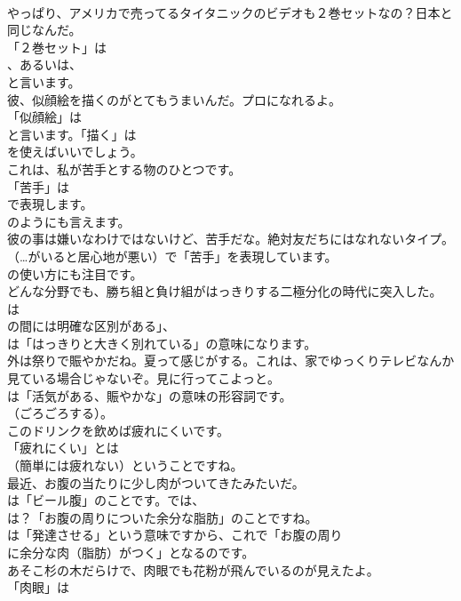 \documentclass[8pt]{extreport}
\begin{document}
\begin{CJK}{UTF8}{min}
\\	やっぱり、アメリカで売ってるタイタニックのビデオも２巻セットなの？日本と同じなんだ。 
\\	「２巻セット」は
\\	、あるいは、
\\	と言います。	
\\	彼、似顔絵を描くのがとてもうまいんだ。プロになれるよ。 
\\	「似顔絵」は
\\	と言います。「描く」は
\\	を使えばいいでしょう。	
\\	これは、私が苦手とする物のひとつです。 
\\	「苦手」は
\\	で表現します。
\\	のようにも言えます。	
\\	彼の事は嫌いなわけではないけど、苦手だな。絶対友だちにはなれないタイプ。 
\\	（…がいると居心地が悪い）で「苦手」を表現しています。
\\	の使い方にも注目です。	
\\	どんな分野でも、勝ち組と負け組がはっきりする二極分化の時代に突入した。 
\\	は
\\	の間には明確な区別がある」、
\\	は「はっきりと大きく別れている」の意味になります。	
\\	外は祭りで賑やかだね。夏って感じがする。これは、家でゆっくりテレビなんか見ている場合じゃないぞ。見に行ってこよっと。 
\\	は「活気がある、賑やかな」の意味の形容詞です。
\\	（ごろごろする）。	
\\	このドリンクを飲めば疲れにくいです。 
\\	「疲れにくい」とは
\\	（簡単には疲れない）ということですね。	
\\	最近、お腹の当たりに少し肉がついてきたみたいだ。 
\\	は「ビール腹」のことです。では、
\\	は？「お腹の周りについた余分な脂肪」のことですね。
\\	は「発達させる」という意味ですから、これで「お腹の周り
\\	に余分な肉（脂肪）がつく」となるのです。	
\\	あそこ杉の木だらけで、肉眼でも花粉が飛んでいるのが見えたよ。 
\\	「肉眼」は

\end{CJK}
\end{document}

